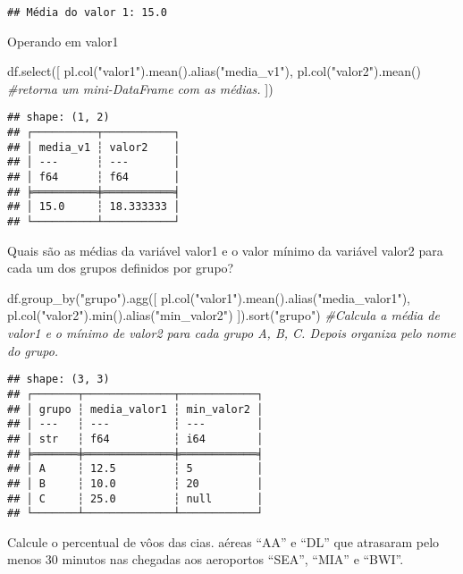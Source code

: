 \documentclass[
]{article}
\newenvironment{Shaded}{\begin{snugshade}}{\end{snugshade}}
\newcommand{\BuiltInTok}[1]{#1}
\newcommand{\CommentTok}[1]{\textcolor[rgb]{0.56,0.35,0.01}{\textit{#1}}}
\newcommand{\NormalTok}[1]{#1}
\newcommand{\StringTok}[1]{\textcolor[rgb]{0.31,0.60,0.02}{#1}}
\begin{document}
\begin{verbatim}
## Média do valor 1: 15.0
\end{verbatim}

Operando em valor1

\begin{Shaded}
\begin{Highlighting}[]
\NormalTok{df.select([}
\NormalTok{  pl.col(}\StringTok{"valor1"}\NormalTok{).mean().alias(}\StringTok{"media\_v1"}\NormalTok{),}
\NormalTok{  pl.col(}\StringTok{"valor2"}\NormalTok{).mean() }\CommentTok{\#retorna um mini{-}DataFrame com as médias.}
\NormalTok{])}
\end{Highlighting}
\end{Shaded}

\begin{verbatim}
## shape: (1, 2)
## ┌──────────┬───────────┐
## │ media_v1 ┆ valor2    │
## │ ---      ┆ ---       │
## │ f64      ┆ f64       │
## ╞══════════╪═══════════╡
## │ 15.0     ┆ 18.333333 │
## └──────────┴───────────┘
\end{verbatim}

Quais são as médias da variável valor1 e o valor mínimo da variável
valor2 para cada um dos grupos definidos por grupo?

\begin{Shaded}
\begin{Highlighting}[]
\NormalTok{df.group\_by(}\StringTok{"grupo"}\NormalTok{).agg([}
\NormalTok{  pl.col(}\StringTok{"valor1"}\NormalTok{).mean().alias(}\StringTok{"media\_valor1"}\NormalTok{),}
\NormalTok{  pl.col(}\StringTok{"valor2"}\NormalTok{).}\BuiltInTok{min}\NormalTok{().alias(}\StringTok{"min\_valor2"}\NormalTok{)}
\NormalTok{]).sort(}\StringTok{"grupo"}\NormalTok{) }\CommentTok{\#Calcula a média de valor1 e o mínimo de valor2 para cada grupo A, B, C. Depois organiza pelo nome do grupo.}
\end{Highlighting}
\end{Shaded}

\begin{verbatim}
## shape: (3, 3)
## ┌───────┬──────────────┬────────────┐
## │ grupo ┆ media_valor1 ┆ min_valor2 │
## │ ---   ┆ ---          ┆ ---        │
## │ str   ┆ f64          ┆ i64        │
## ╞═══════╪══════════════╪════════════╡
## │ A     ┆ 12.5         ┆ 5          │
## │ B     ┆ 10.0         ┆ 20         │
## │ C     ┆ 25.0         ┆ null       │
## └───────┴──────────────┴────────────┘
\end{verbatim}

Calcule o percentual de vôos das cias. aéreas ``AA'' e ``DL'' que
atrasaram pelo menos 30 minutos nas chegadas aos aeroportos ``SEA'',
``MIA'' e ``BWI''.
\end{document}
